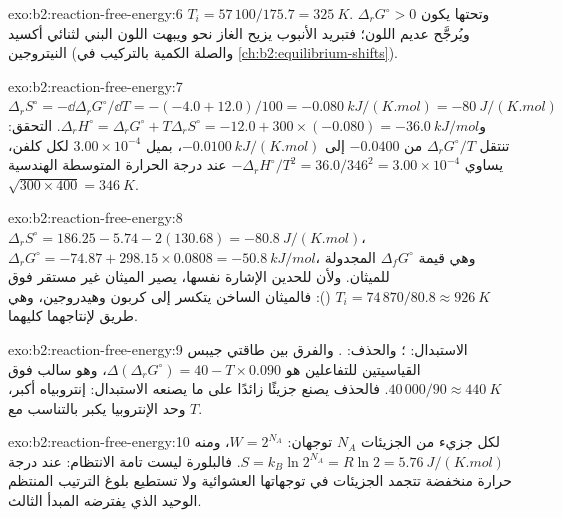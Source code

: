 \begin{solution}{exo:b2:reaction-free-energy:6}
$T_i = 57\,100/175.7 = \qty{325}{K}$. وتحتها يكون $\Delta_r G^\circ > 0$
ويُرجَّح  عديم اللون؛ فتبريد الأنبوب يزيح الغاز نحو
 ويبهت اللون البني لثنائي أكسيد النيتروجين  (والصلة الكمية بالتركيب
في \cref{ch:b2:equilibrium-shifts}).
\end{solution}

\begin{solution}{exo:b2:reaction-free-energy:7}
$\Delta_r S^\circ = -\dd\Delta_r G^\circ/\dd T = -(-4.0 + 12.0)/100 =
\qty{-0.080}{kJ/(K.mol)} = \qty{-80}{J/(K.mol)}$ و$\Delta_r H^\circ =
\Delta_r G^\circ + T\Delta_r S^\circ = -12.0 + 300 \times (-0.080) =
\qty{-36.0}{kJ/mol}$. التحقق: تنتقل $\Delta_r G^\circ/T$ من $-0.0400$ إلى
$\qty{-0.0100}{kJ/(K.mol)}$، بميل $3.00 \times 10^{-4}$ لكل كلفن، يساوي
$-\Delta_r H^\circ/T^2 = 36.0/346^2 = 3.00 \times 10^{-4}$ عند درجة الحرارة
المتوسطة الهندسية $\sqrt{300 \times 400} = \qty{346}{K}$.
\end{solution}

\begin{solution}{exo:b2:reaction-free-energy:8}
$\Delta_r S^\circ = 186.25 - 5.74 - 2(130.68) = \qty{-80.8}{J/(K.mol)}$،
$\Delta_r G^\circ = -74.87 + 298.15 \times 0.0808 = \qty{-50.8}{kJ/mol}$،
وهي قيمة $\Delta_f G^\circ$ المجدولة للميثان. ولأن للحدين الإشارة
نفسها، يصير الميثان غير مستقر فوق $T_i = 74\,870/80.8 \approx
\qty{926}{K}$ (): فالميثان الساخن يتكسر إلى كربون
وهيدروجين، وهي طريق لإنتاجهما كليهما.
\end{solution}

\begin{solution}{exo:b2:reaction-free-energy:9}
الاستبدال: ؛ والحذف:
. والفرق بين طاقتي جيبس
القياسيتين للتفاعلين هو $\Delta(\Delta_r G^\circ) = 40 - T \times
0.090$، وهو سالب فوق $40\,000/90 \approx \qty{440}{K}$. فالحذف يصنع
جزيئًا زائدًا على ما يصنعه الاستبدال: إنتروبياه أكبر، وحد الإنتروبيا
يكبر بالتناسب مع $T$.
\end{solution}

\begin{solution}{exo:b2:reaction-free-energy:10}
لكل جزيء من الجزيئات $N_A$ توجهان: $W = 2^{N_A}$، ومنه $S =
k_B\ln 2^{N_A} = R\ln 2 = \qty{5.76}{J/(K.mol)}$. فالبلورة ليست تامة
الانتظام: عند درجة حرارة منخفضة تتجمد الجزيئات في توجهاتها العشوائية
ولا تستطيع بلوغ الترتيب المنتظم الوحيد الذي يفترضه المبدأ
الثالث.
\end{solution}

